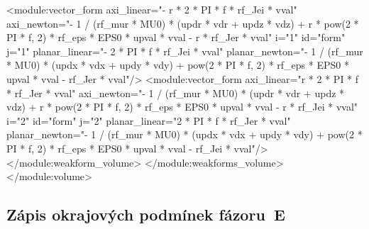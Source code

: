 \documentclass[12pt,a4paper,oneside]{article}
\numberwithin{equation}{section} %
\numberwithin{figure}{section} %
\numberwithin{table}{section} %
\begin{document}
\begin{spverbatim}
        <module:vector_form axi_linear="- r * 2 * PI * f * rf_Jei * vval" axi_newton="- 1 / (rf_mur * MU0) * (updr * vdr + updz * vdz) + r * pow(2 * PI * f, 2) * rf_eps * EPS0 * upval * vval - r * rf_Jer * vval" i="1" id="form" j="1" planar_linear="- 2 * PI * f * rf_Jei * vval" planar_newton="- 1 / (rf_mur * MU0) * (updx * vdx + updy * vdy) + pow(2 * PI * f, 2) * rf_eps * EPS0 * upval * vval - rf_Jer * vval"/>
        <module:vector_form axi_linear="r * 2 * PI * f * rf_Jer * vval" axi_newton="- 1 / (rf_mur * MU0) * (updr * vdr + updz * vdz) + r * pow(2 * PI * f, 2) * rf_eps * EPS0 * upval * vval - r * rf_Jei * vval" i="2" id="form" j="2" planar_linear="2 * PI * f * rf_Jer * vval" planar_newton="- 1 / (rf_mur * MU0) * (updx * vdx + updy * vdy) + pow(2 * PI * f, 2) * rf_eps * EPS0 * upval * vval - rf_Jei * vval"/>
      </module:weakform_volume>
    </module:weakforms_volume>
  </module:volume>
\end{spverbatim}


\subsection*{Zápis okrajových podmínek fázoru~E}
\label{XMLEs}
\end{document}
